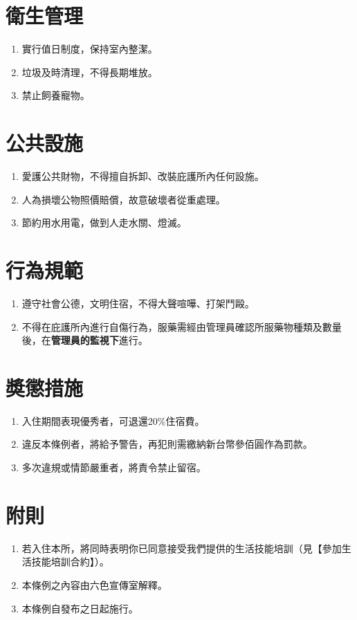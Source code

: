 \documentclass[12pt]{article}
\begin{document}
\section{衛生管理}
\begin{enumerate}
	\item 實行值日制度，保持室內整潔。
	\item 垃圾及時清理，不得長期堆放。
	\item 禁止飼養寵物。
\end{enumerate}

\section{公共設施}
\begin{enumerate}
    \item 愛護公共財物，不得擅自拆卸、改裝庇護所內任何設施。
    \item 人為損壞公物照價賠償，故意破壞者從重處理。
    \item 節約用水用電，做到人走水關、燈滅。
\end{enumerate}

\section{行為規範}
\begin{enumerate}
    \item 遵守社會公德，文明住宿，不得大聲喧嘩、打架鬥毆。
    \item 不得在庇護所內進行自傷行為，服藥需經由管理員確認所服藥物種類及數量後，在\textbf{管理員的監視下}進行。
\end{enumerate}

\section{奬懲措施}
\begin{enumerate}
    \item 入住期間表現優秀者，可退還20\%住宿費。
    \item 違反本條例者，將給予警告，再犯則需繳納新台幣參佰圓作為罰款。
    \item 多次違規或情節嚴重者，將責令禁止留宿。
\end{enumerate}

\section{附則}
\begin{enumerate}
	\item 若入住本所，將同時表明你已同意接受我們提供的生活技能培訓（見【參加生活技能培訓合約】）。
    \item 本條例之內容由六色宣傳室解釋。
    \item 本條例自發布之日起施行。
\end{enumerate}
\end{document}
